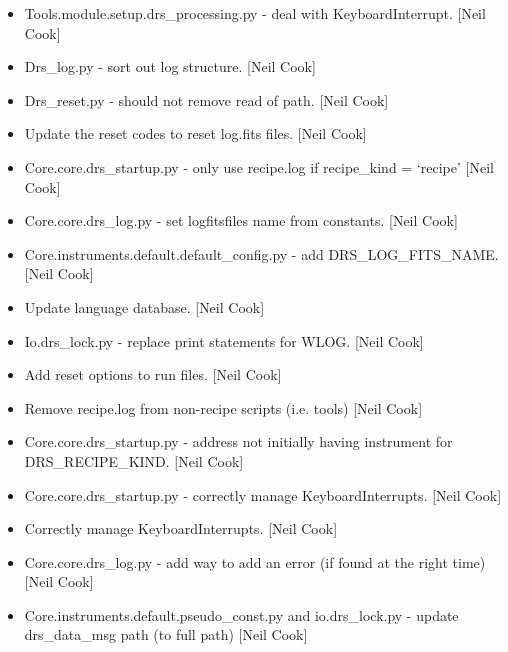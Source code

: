 \documentclass[a4paper,10pt,english]{report}
\begin{document}
\begin{itemize}
\item {} 
Tools.module.setup.drs\_processing.py - deal with KeyboardInterrupt.
{[}Neil Cook{]}

\item {} 
Drs\_log.py - sort out log structure. {[}Neil Cook{]}

\item {} 
Drs\_reset.py - should not remove read of path. {[}Neil Cook{]}

\item {} 
Update the reset codes to reset log.fits files. {[}Neil Cook{]}

\item {} 
Core.core.drs\_startup.py - only use recipe.log if recipe\_kind =
‘recipe’ {[}Neil Cook{]}

\item {} 
Core.core.drs\_log.py - set logfitsfiles name from constants. {[}Neil
Cook{]}

\item {} 
Core.instruments.default.default\_config.py - add DRS\_LOG\_FITS\_NAME.
{[}Neil Cook{]}

\item {} 
Update language database. {[}Neil Cook{]}

\item {} 
Io.drs\_lock.py - replace print statements for WLOG. {[}Neil Cook{]}

\item {} 
Add reset options to run files. {[}Neil Cook{]}

\item {} 
Remove recipe.log from non-recipe scripts (i.e. tools) {[}Neil Cook{]}

\item {} 
Core.core.drs\_startup.py - address not initially having instrument for
DRS\_RECIPE\_KIND. {[}Neil Cook{]}

\item {} 
Core.core.drs\_startup.py - correctly manage KeyboardInterrupts. {[}Neil
Cook{]}

\item {} 
Correctly manage KeyboardInterrupts. {[}Neil Cook{]}

\item {} 
Core.core.drs\_log.py - add way to add an error (if found at the right
time) {[}Neil Cook{]}

\item {} 
Core.instruments.default.pseudo\_const.py and io.drs\_lock.py - update
drs\_data\_msg path (to full path) {[}Neil Cook{]}


\end{itemize}
\end{document}
